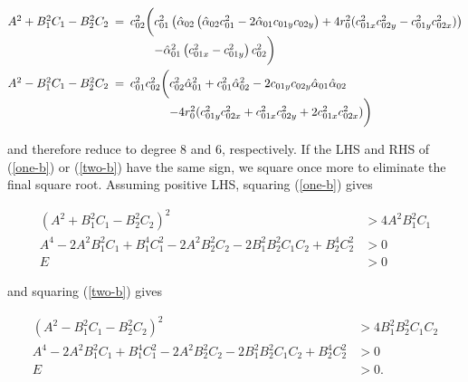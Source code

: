 \documentclass[11pt]{article}
\newcommand{\halpha}{\hat{\alpha}}
\begin{document}
\begin{linenomath*}
\begin{align*}
\begin{array}{@{}r} A^2 + B_1^2 C_1 - B_2^2 C_2 \phantom{\bigg(} \hspace{-.5em}= \\ \phantom{\bigg(} \end{array}&%
\begin{array}{@{}r@{}l@{}} c_{02}^2 \bigg(& c_{01}^2 \left(\halpha_{02} \left(\halpha_{02} c_{01}^2 - 2 \halpha_{01} c_{01y} c_{02y}\right)
  + 4 r_0^2 (c_{01x}^2 c_{02y}^2 - c_{01y}^2 c_{02x}^2)\right) \\
  &- \halpha_{01}^2 \left(c_{01x}^2 - c_{01y}^2\right) c_{02}^2 \bigg) \end{array} \\
\begin{array}{@{}r} A^2 - B_1^2 C_1 - B_2^2 C_2 \phantom{\bigg(} \hspace{-.5em}= \\ \phantom{\bigg(} \end{array}&%
\begin{array}{@{}r@{}l@{}} c_{01}^2 c_{02}^2 \bigg(& c_{02}^2 \halpha_{01}^2 + c_{01}^2 \halpha_{02}^2 - 2 c_{01y} c_{02y} \halpha_{01} \halpha_{02} \\
  &- 4 r_0^2 (c_{01y}^2 c_{02x}^2 + c_{01x}^2 c_{02y}^2 + 2c_{01x}^2 c_{02x}^2) \bigg) \end{array}
\end{align*}
\end{linenomath*}
and therefore reduce to degree 8 and 6, respectively.  If the LHS and RHS of (\ref{one-b}) or (\ref{two-b}) have the same sign, we square once
more to eliminate the final square root.  Assuming positive LHS, squaring (\ref{one-b}) gives
\begin{linenomath*}
\begin{align*}
(A^2 + B_1^2 C_1 - B_2^2 C_2)^2 &> 4 A^2 B_1^2 C_1 \\
A^4 - 2A^2 B_1^2 C_1 + B_1^4 C_1^2 - 2 A^2 B_2^2 C_2 - 2 B_1^2 B_2^2 C_1 C_2 + B_2^4 C_2^2 &> 0 \\
E &> 0 
\end{align*}
\end{linenomath*}
and squaring (\ref{two-b}) gives
\begin{linenomath*}
\begin{align*}
(A^2 - B_1^2 C_1 - B_2^2 C_2)^2 &> 4 B_1^2 B_2^2 C_1 C_2 \\
A^4 - 2A^2 B_1^2 C_1 + B_1^4 C_1^2 - 2 A^2 B_2^2 C_2 - 2 B_1^2 B_2^2 C_1 C_2 + B_2^4 C_2^2 &> 0 \\
E &> 0.
\end{align*}
\end{linenomath*}
\end{document}

